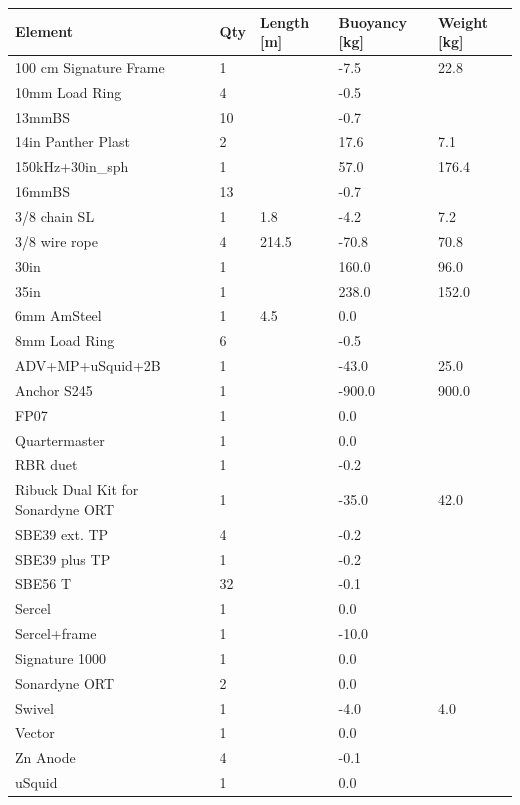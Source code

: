 \documentclass{article}
\begin{document}
\begin{tabularx}{\linewidth}{|l|l|l|l|l|}
\caption{S245 \textcolor{green}{$\blacksquare$}: Element summary}\\
\hline
\textbf{Element} & \textbf{Qty} & \textbf{Length [m]} & \textbf{Buoyancy [kg]} & \textbf{Weight [kg]} \\
\hline
100 cm Signature Frame & 1 &  & -7.5 & 22.8 \\ \hline
10mm Load Ring & 4 &  & -0.5 &  \\ \hline
13mmBS & 10 &  & -0.7 &  \\ \hline
14in Panther Plast & 2 &  & 17.6 & 7.1 \\ \hline
150kHz+30in\_sph & 1 &  & 57.0 & 176.4 \\ \hline
16mmBS & 13 &  & -0.7 &  \\ \hline
3/8 chain SL & 1 & 1.8 & -4.2 & 7.2 \\ \hline
3/8 wire rope & 4 & 214.5 & -70.8 & 70.8 \\ \hline
30in & 1 &  & 160.0 & 96.0 \\ \hline
35in & 1 &  & 238.0 & 152.0 \\ \hline
6mm AmSteel & 1 & 4.5 & 0.0 &  \\ \hline
8mm Load Ring & 6 &  & -0.5 &  \\ \hline
ADV+MP+uSquid+2B & 1 &  & -43.0 & 25.0 \\ \hline
Anchor S245 & 1 &  & -900.0 & 900.0 \\ \hline
FP07 & 1 &  & 0.0 &  \\ \hline
Quartermaster & 1 &  & 0.0 &  \\ \hline
RBR duet & 1 &  & -0.2 &  \\ \hline
Ribuck Dual Kit for Sonardyne ORT & 1 &  & -35.0 & 42.0 \\ \hline
SBE39 ext. TP & 4 &  & -0.2 &  \\ \hline
SBE39 plus TP & 1 &  & -0.2 &  \\ \hline
SBE56 T & 32 &  & -0.1 &  \\ \hline
Sercel & 1 &  & 0.0 &  \\ \hline
Sercel+frame & 1 &  & -10.0 &  \\ \hline
Signature 1000 & 1 &  & 0.0 &  \\ \hline
Sonardyne ORT & 2 &  & 0.0 &  \\ \hline
Swivel & 1 &  & -4.0 & 4.0 \\ \hline
Vector & 1 &  & 0.0 &  \\ \hline
Zn Anode & 4 &  & -0.1 &  \\ \hline
uSquid & 1 &  & 0.0 &  \\ \hline
\end{tabularx}
\end{document}
